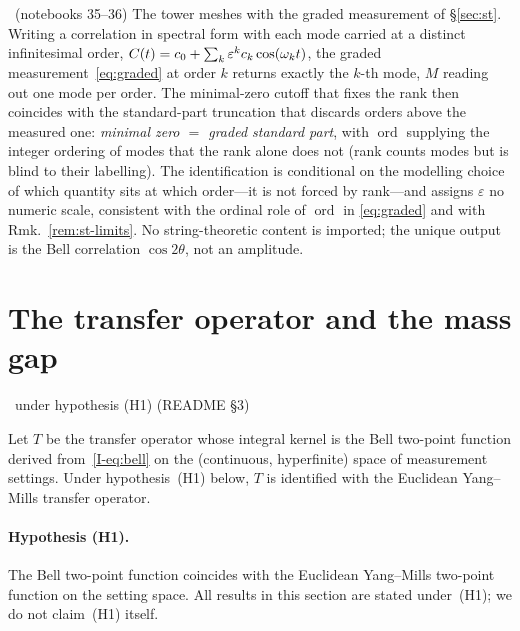 \documentclass[11pt]{article}
\begin{document}
\begin{remark}\label{rem:tower-nsa}
\conditional\ (notebooks 35--36)
The tower meshes with the graded measurement of \S\ref{sec:st}. Writing a
correlation in spectral form with each mode carried at a distinct
infinitesimal order, $C(t)=c_0+\sum_k\varepsilon^{k}c_k\cos(\omega_k t)$,
the graded measurement~\eqref{eq:graded} at order $k$ returns exactly the
$k$-th mode, $M$ reading out one mode per order. The minimal-zero cutoff
that fixes the rank then coincides with the standard-part truncation that
discards orders above the measured one: \emph{minimal zero $=$ graded
standard part}, with $\operatorname{ord}$ supplying the integer ordering of
modes that the rank alone does not (rank counts modes but is blind to their
labelling). The identification is conditional on the modelling choice of
which quantity sits at which order---it is not forced by rank---and assigns
$\varepsilon$ no numeric scale, consistent with the ordinal role of
$\operatorname{ord}$ in \eqref{eq:graded} and with Rmk.~\ref{rem:st-limits}.
No string-theoretic content is imported; the unique output is the Bell
correlation $\cos2\theta$, not an amplitude.
\end{remark}

\section{The transfer operator and the mass gap}\label{sec:gap}
\conditional\ under hypothesis (H1) (README \S3)

\begin{definition}\label{def:transfer}
Let $T$ be the transfer operator whose integral kernel is the Bell two-point function
derived from~\eqref{I-eq:bell} on the (continuous, hyperfinite) space of measurement
settings. Under hypothesis~(H1) below, $T$ is identified with the Euclidean Yang--Mills
transfer operator.
\end{definition}

\paragraph{Hypothesis (H1).} The Bell two-point function coincides with the Euclidean
Yang--Mills two-point function on the setting space. All results in this section are stated
under~(H1); we do not claim~(H1) itself.
\end{document}
